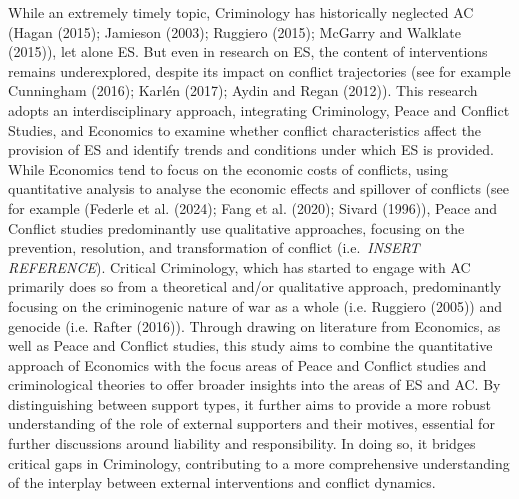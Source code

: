 \documentclass[
]{article}
\begin{document}
While an extremely timely topic, Criminology has historically neglected
AC (Hagan (2015); Jamieson (2003); Ruggiero (2015); McGarry and Walklate
(2015)), let alone ES. But even in research on ES, the content of
interventions remains underexplored, despite its impact on conflict
trajectories (see for example Cunningham (2016); Karlén (2017); Aydin
and Regan (2012)). This research adopts an interdisciplinary approach,
integrating Criminology, Peace and Conflict Studies, and Economics to
examine whether conflict characteristics affect the provision of ES and
identify trends and conditions under which ES is provided. While
Economics tend to focus on the economic costs of conflicts, using
quantitative analysis to analyse the economic effects and spillover of
conflicts (see for example (Federle et al. (2024); Fang et al. (2020);
Sivard (1996)), Peace and Conflict studies predominantly use qualitative
approaches, focusing on the prevention, resolution, and transformation
of conflict (i.e.~\emph{INSERT REFERENCE}). Critical Criminology, which
has started to engage with AC primarily does so from a theoretical
and/or qualitative approach, predominantly focusing on the criminogenic
nature of war as a whole (i.e. Ruggiero (2005)) and genocide (i.e.
Rafter (2016)). Through drawing on literature from Economics, as well as
Peace and Conflict studies, this study aims to combine the quantitative
approach of Economics with the focus areas of Peace and Conflict studies
and criminological theories to offer broader insights into the areas of
ES and AC. By distinguishing between support types, it further aims to
provide a more robust understanding of the role of external supporters
and their motives, essential for further discussions around liability
and responsibility. In doing so, it bridges critical gaps in
Criminology, contributing to a more comprehensive understanding of the
interplay between external interventions and conflict dynamics.
\end{document}
